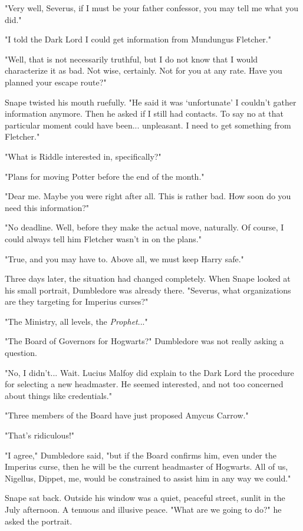 \documentclass[a4paper,11pt]{article}
\begin{document}
"Very well, Severus, if I must be your father confessor, you may tell me what you did."

"I told the Dark Lord I could get information from Mundungus Fletcher."

"Well, that is not necessarily truthful, but I do not know that I would characterize it as bad. Not wise, certainly. Not for you at any rate. Have you planned your escape route?"

Snape twisted his mouth ruefully. "He said it was `unfortunate' I couldn't gather information anymore. Then he asked if I still had contacts. To say no at that particular moment could have been... unpleasant. I need to get something from Fletcher."

"What is Riddle interested in, specifically?"

"Plans for moving Potter before the end of the month."

"Dear me. Maybe you were right after all. This is rather bad. How soon do you need this information?"

"No deadline. Well, before they make the actual move, naturally. Of course, I could always tell him Fletcher wasn't in on the plans."

"True, and you may have to. Above all, we must keep Harry safe."

Three days later, the situation had changed completely. When Snape looked at his small portrait, Dumbledore was already there. "Severus, what organizations are they targeting for Imperius curses?"

"The Ministry, all levels, the \emph{Prophet}..."

"The Board of Governors for Hogwarts?" Dumbledore was not really asking a question.

"No, I didn't... Wait. Lucius Malfoy did explain to the Dark Lord the procedure for selecting a new headmaster. He seemed interested, and not too concerned about things like credentials."

"Three members of the Board have just proposed Amycus Carrow."

"That's ridiculous!"

"I agree," Dumbledore said, "but if the Board confirms him, even under the Imperius curse, then he will be the current headmaster of Hogwarts. All of us, Nigellus, Dippet, me, would be constrained to assist him in any way we could."

Snape sat back. Outside his window was a quiet, peaceful street, sunlit in the July afternoon. A tenuous and illusive peace. "What are we going to do?" he asked the portrait.
\end{document}
